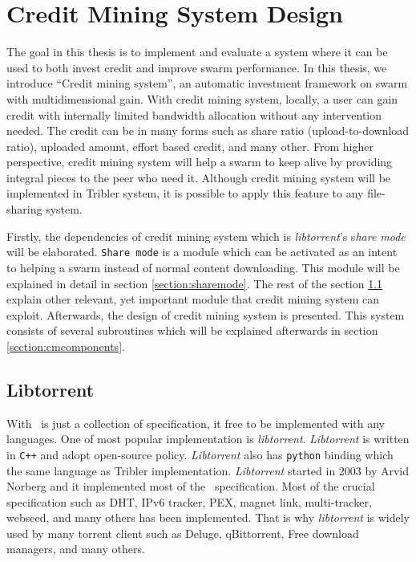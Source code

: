 \chapter{Credit Mining System Design}
\label{chp:design}

The goal in this thesis is to implement and evaluate a system where it can be used to both invest credit and improve swarm performance. In this thesis, we introduce ``Credit mining system'', an automatic investment framework on swarm with multidimensional gain. With credit mining system, locally, a user can gain credit with internally limited bandwidth allocation without any intervention needed. The credit can be in many forms such as share ratio (upload-to-download ratio), uploaded amount, effort based credit, and many other. From higher perspective, credit mining system will help a swarm to keep alive by providing integral pieces to the peer who need it. Although credit mining system will be implemented in Tribler system, it is possible to apply this feature to any file-sharing system.

Firstly, the dependencies of credit mining system which is \textit{libtorrent}'s s\textit{hare mode} will be elaborated. \texttt{Share mode} is a module which can be activated as an intent to helping a swarm instead of normal content downloading. This module will be explained in detail in section \ref{section:sharemode}. The rest of the section \ref{section:libtorrent} explain other relevant, yet important module that credit mining system can exploit. Afterwards, the design of credit mining system is presented. This system consists of several subroutines which will be explained afterwards in section \ref{section:cmcomponents}. 

\section{Libtorrent}
\label{section:libtorrent}
With \bt~is just a collection of specification, it free to be implemented with any languages. One of most popular implementation is \textit{libtorrent}. \textit{Libtorrent} is written in \texttt{C++} and adopt open-source policy. \textit{Libtorrent} also has \texttt{python} binding which the same language as Tribler implementation. \textit{Libtorrent} started in 2003 by Arvid Norberg and it implemented most of the \bt~specification. Most of the crucial specification such as DHT, IPv6 tracker, PEX, magnet link, multi-tracker, webseed, and many others has been implemented. That is why \textit{libtorrent} is widely used by many torrent client such as Deluge, qBittorrent, Free download managers, and many others.

